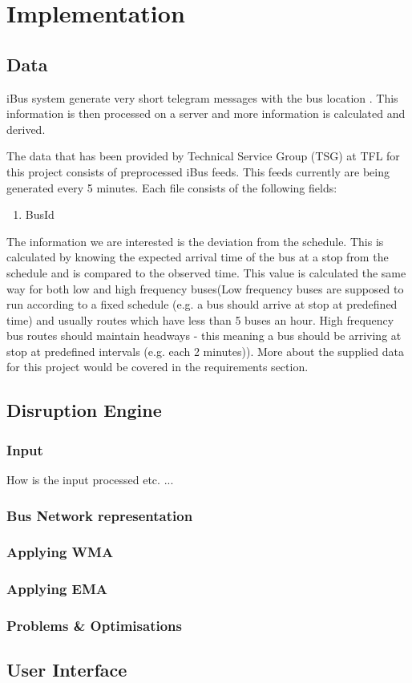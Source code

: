 \chapter{Implementation}

\section{Data}
iBus system generate very short telegram messages with the bus location \cite{Hounsell201276}. This information is then processed on a server and more information is calculated and derived.

The data that has been provided by Technical Service Group (TSG) at TFL for this project consists of preprocessed iBus feeds. This feeds currently are being generated every 5 minutes. Each file consists of the following fields:
\begin{enumerate}
\item BusId
\end{enumerate}

The information we are interested is the deviation from the schedule. This is calculated by knowing the expected arrival time of the bus at a stop from the schedule and is compared to the observed time. This value is calculated the same way for both low and high frequency buses(Low frequency buses are supposed to run according to a fixed schedule (e.g. a bus should arrive at stop at predefined time) and usually routes which have less than 5 buses an hour. High frequency bus routes should maintain headways - this meaning a bus should be arriving at stop at predefined intervals (e.g. each 2 minutes)). More about the supplied data for this project would be covered in the requirements section.

\section{Disruption Engine}
	\subsection{Input}
	How is the input processed etc. ...
	\subsection{Bus Network representation}
	
	\subsection{Applying WMA}
	
	\subsection{Applying EMA}
	
	\subsection{Problems \& Optimisations}
	
\section{User Interface}
